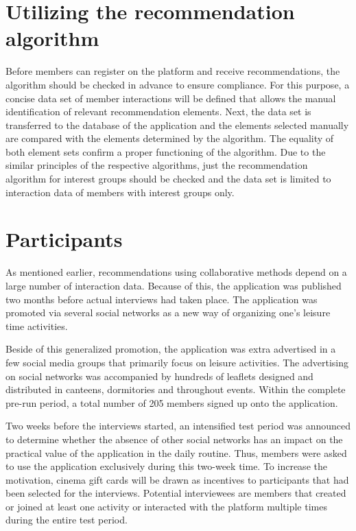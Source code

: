 \documentclass[12pt,numbers=noenddot,parskip,bibliography=totocnumbered,listof=totocnumbered,draft]{scrreprt}
\begin{document}
\section{Utilizing the recommendation algorithm}
Before members can register on the platform and receive recommendations, the algorithm should be checked in advance to ensure compliance. For this purpose, a concise data set of member interactions will be defined that allows the manual identification of relevant recommendation elements. Next, the data set is transferred to the database of the application and the elements selected manually are compared with the elements determined by the algorithm. The equality of both element sets confirm a proper functioning of the algorithm. Due to the similar principles of the respective algorithms, just the recommendation algorithm for interest groups should be checked and the data set is limited to interaction data of members with interest groups only.

\section{Participants}
As mentioned earlier, recommendations using collaborative methods depend on a large number of interaction data. Because of this, the application was published two months before actual interviews had taken place. The application was promoted via several social networks as a new way of organizing one's leisure time activities.

Beside of this generalized promotion, the application was extra advertised in a few social media groups that primarily focus on leisure activities. The advertising on social networks was accompanied by hundreds of leaflets designed and distributed in canteens, dormitories and throughout events. Within the complete pre-run period, a total number of 205 members signed up onto the application. 

Two weeks before the interviews started, an intensified test period was announced to determine whether the absence of other social networks has an impact on the practical value of the application in the daily routine. Thus, members were asked to use the application exclusively during this two-week time. To increase the motivation, cinema gift cards will be drawn as incentives to participants that had been selected for the interviews. Potential interviewees are members that created or joined at least one activity or interacted with the platform multiple times during the entire test period. 
\end{document}

